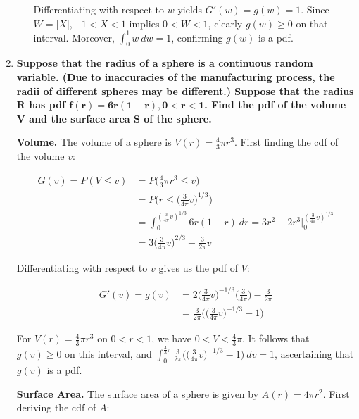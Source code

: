 \documentclass[10pt, oneside]{article}   	%
\theoremstyle{definition}
\begin{document}
\begin{enumerate}[label=5.\arabic*]
\begin{enumerate}
	Differentiating with respect to $w$ yields $G'(w) = g(w) = \boxed{1}$. Since $W = |X|, -1 < X < 1$ implies $0 < W < 1$, clearly $g(w) \geq 0$ on that interval. Moreover, $\int^1_0 w \ dw = \boxed{1}$, confirming $g(w)$ is a pdf.
	
	\end{enumerate}

\item  \begin{tcolorbox}[
  colback=Cerulean!5!white,
  colframe=Cerulean!75!black]
\textbf{Suppose that the radius of a sphere is a continuous random variable. (Due to inaccuracies of the manufacturing process, the radii of different spheres may be different.) Suppose that the radius $\bm{R}$ has pdf $\bm{f(r) = 6r(1-r), 0 < r < 1}$. Find the pdf of the volume $\bm{V}$ and the surface area $\bm{S}$ of the sphere.}
\end{tcolorbox}

\textbf{Volume.} The volume of a sphere is $V(r) = \frac{4}{3} \pi r^3$. First finding the cdf of the volume $v$:

\begin{align*}
G(v) = P(V \leq v) &= P \Big( \frac{4}{3} \pi r^3 \leq v \Big) \\
&= P \Big( r \leq \Big( \frac{3}{4 \pi} v \Big)^{1/3} \Big) \\
&= \int^{(\frac{3}{4 \pi} v)^{1/3}}_0 6r(1 - r) \ dr = 3r^2 - 2r^3 \Big|^{(\frac{3}{4 \pi} v)^{1/3}}_0 \\
&= 3 \Big( \frac{3}{4 \pi} v \Big)^{2/3} - \frac{3}{2 \pi} v 
\end{align*}

Differentiating with respect to $v$ gives us the pdf of $V$:

\begin{align*}
G'(v) = g(v) &= 2 \Big( \frac{3}{4 \pi} v \Big)^{-1/3} \Big( \frac{3}{4 \pi} \Big) - \frac{3}{2 \pi} \\
&= \boxed{\frac{3}{2 \pi} \Big( \Big( \frac{3}{4 \pi} v \Big)^{-1/3} - 1 \Big)}
\end{align*}

For $V(r) = \frac{4}{3} \pi r^3$ on $0 < r < 1$, we have $0 < V < \frac{4}{3} \pi$. It follows that $g(v) \geq 0$ on this interval, and $\int^{\frac{4}{3} \pi}_0 \frac{3}{2 \pi} \Big( \Big( \frac{3}{4 \pi} v \Big)^{-1/3} - 1 \Big) \ dv = \boxed{1}$, ascertaining that $g(v)$ is a pdf.

\textbf{Surface Area.} The surface area of a sphere is given by $A(r) = 4 \pi r^2$. First deriving the cdf of $A$:


\end{enumerate}
\end{document}
